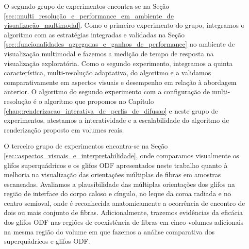 O segundo grupo de experimentos encontra-se na Seção \ref{sec::multi_resolução_e_performance_em_ambiente_de visualização_multimodal}. Como o primeiro experimento do grupo, integramos o algoritmo com as estratégias integradas e validadas na Seção \ref{sec::funcionalidades_agregadas_e_ganhos_de_performance} no ambiente de visualização multimodal e fazemos a medição de tempo de resposta na visualização exploratória. Como o segundo experimento, integramos a quinta característica, multi-resolução adaptativa, do algoritmo e a validamos comparativamente em aspectos visuais e desempenho em relação à abordagem anterior. O algoritmo do segundo experimento com a configuração de multi-resolução é o algoritmo que propomos no Capítulo \ref{chap::renderizacao_interativa_de_perfis_de_difusao} e neste grupo de experimentos, atestamos a interatividade e a escalabilidade do algoritmo de renderização proposto em volumes reais.


O terceiro grupo de experimentos encontra-se na Seção \ref{sec::aspectos_visuais_e_interpretabilidade}, onde comparamos visualmente os glifos superquádricos e os glifos ODF apresentados neste trabalho quanto à melhoria na visualização das orientações múltiplas de fibras em amostras escaneadas. Avaliamos a plausibilidade das múltiplas orientações dos glifos na região de interface do corpo caloso e cíngulo, no leque da coroa radiada e no centro semioval, onde é reconhecida anatomicamente a ocorrência de encontro de dois ou mais conjunto de fibras. Adicionalmente, trazemos evidências da eficácia dos glifos ODF nas regiões de coexistência de fibras em cinco volumes adicionais na mesma região do volume em que fazemos a análise comparativa dos superquádricos e glifos ODF.
 

